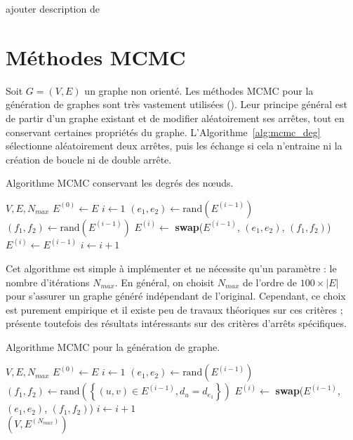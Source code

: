 \documentclass[a4paper]{article}
\begin{document}
\begin{todo}
ajouter description de \cite{erdHos1960evolution}
\end{todo}

\section{Méthodes MCMC}
\label{sec:methodes_mcmc}
    Soit $G = (V, E)$ un graphe non orienté.
    Les méthodes MCMC pour la génération de graphes sont très vastement
    utilisées (\cite{rao1996markov}). Leur principe général est de partir
    d'un graphe existant et de modifier aléatoirement ses arrêtes, tout en
    conservant certaines propriétés du graphe. L'Algorithme~\ref{alg:mcmc_deg}
    sélectionne aléatoirement deux arrêtes, puis les échange si cela
    n'entraine ni la création de boucle ni de double arrête.

    \begin{algorithm}
        \caption{Algorithme MCMC conservant les degrés des n\oe{}uds.}
        \label{alg:mcmc_deg}
        \begin{algorithmic}[1]
            \Require $V, E, N_{max}$
            \State $E^{(0)} \gets E$
            \State $i \gets 1$
                \State $(e_1, e_2) \gets \text{rand}(E^{(i-1)})$
                \State $(f_1, f_2) \gets \text{rand}(E^{(i-1)})$
                    \State $E^{(i)} \gets$
                        \textbf{swap}($E^{(i-1)}$, $(e_1, e_2)$, $(f_1, f_2)$)
                \Else
                    \State $E^{(i)} \gets E^{(i-1)}$
                \EndIf
                \State $i \gets i + 1$
            \EndWhile
        \end{algorithmic}
    \end{algorithm}

    Cet algorithme est simple à implémenter et ne nécessite qu'un paramètre :
    le nombre d'itérations $N_{max}$. En général, on choisit $N_{max}$ de
    l'ordre de $100 \times |E|$ pour s'assurer un graphe généré indépendant de
    l'original. Cependant, ce choix est purement empirique et il existe peu
    de travaux théoriques sur ces critères ; \cite{ray2012we} présente
    toutefois des résultats intéressants sur des critères d'arrêts spécifiques.

    \begin{algorithm}
        \caption{Algorithme MCMC pour la génération de graphe.}
        \label{alg:mcmc_joint}
        \begin{algorithmic}
            \Require $V, E, N_{max}$
            \State $E^{(0)} \gets E$
            \State $i \gets 1$
                \State $(e_1, e_2) \gets \text{rand}(E^{(i-1)})$
                \State $(f_1, f_2) \gets \text{rand}(\left\{ (u, v) \in E^{(i-1)}, d_u = d_{e_1} \right\})$
                \State $E^{(i)} \gets$
                    \textbf{swap}($E^{(i-1)}$, $(e_1, e_2)$, $(f_1, f_2)$)
                \State $i \gets i + 1$
            \EndWhile \\
            \Return $(V, E^{(N_{max})})$
        \end{algorithmic}
    \end{algorithm}
\end{document}
